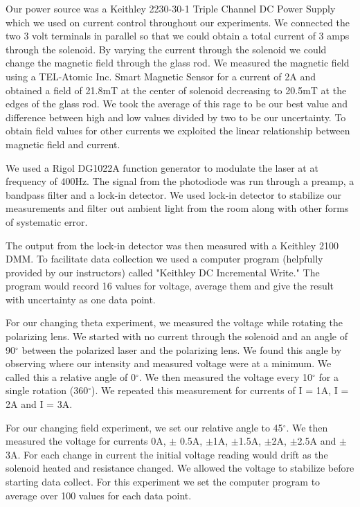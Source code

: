 \documentclass[prb,preprint]{revtex4-1}
\begin{document}
Our power source was a Keithley 2230-30-1 Triple Channel DC Power Supply which we used on current control throughout our experiments. We connected the two 3 volt terminals in parallel so that we could obtain a total current of 3 amps through the solenoid. By varying the current through the solenoid we could change the magnetic field through the glass rod. We measured the magnetic field using a TEL-Atomic Inc. Smart Magnetic Sensor for a current of 2A and obtained a field of 21.8mT at the center of solenoid decreasing to 20.5mT at the edges of the glass rod. We took the average of this rage to be our best value and difference between high and low values divided by two to be our uncertainty. To obtain field values for other currents we exploited the linear relationship between magnetic field and current.

We used a Rigol DG1022A function generator to modulate the laser at at frequency of 400Hz. The signal from the photodiode was run through a preamp, a bandpass filter and a lock-in detector. We used lock-in detector to stabilize our measurements and filter out ambient light from the room along with other forms of systematic error.

The output from the lock-in detector was then measured with a Keithley 2100 DMM. To facilitate data collection we used a computer program (helpfully provided by our instructors) called "Keithley DC Incremental Write." The program would record 16 values for voltage, average them and give the result with uncertainty as one data point. 

For our changing theta experiment, we measured the voltage while rotating the polarizing lens. We started with no current through the solenoid and an angle of 90$^{\circ}$ between the polarized laser and the polarizing lens. We found this angle by observing where our intensity and measured voltage were at a minimum. We called this a relative angle of 0$^{\circ}$. We then measured the voltage every 10$^{\circ}$ for a single rotation (360$^{\circ}$). We repeated this measurement for currents of I = 1A, I = 2A and I = 3A.

For our changing field experiment, we set our relative angle to 45$^{\circ}$. We then measured the voltage for currents 0A, $\pm$ 0.5A, $\pm$1A, $\pm$1.5A, $\pm$2A, $\pm$2.5A and $\pm$3A. For each change in current the initial voltage reading would drift as the solenoid heated and resistance changed. We allowed the voltage to stabilize before starting data collect. For this experiment we set the computer program to average over 100 values for each data point.
\end{document}
